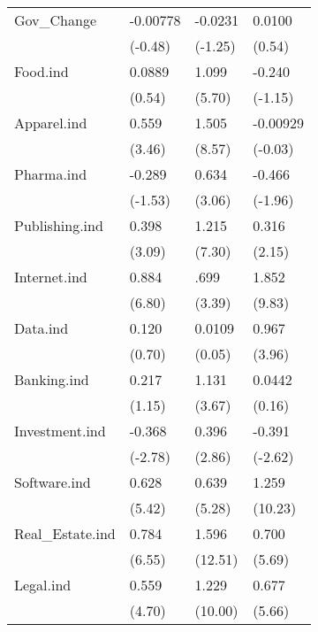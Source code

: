 \begin{longtable}{p{3 cm} p{2.25 cm} p{2.25 cm} p{2.25 cm}}
Gov\_Change  &    -0.00778         &     -0.0231         &      0.0100         \\
            &     (-0.48)         &     (-1.25)         &      (0.54)         \\
Food.ind &      0.0889         &       1.099\sym{***}&      -0.240         \\
            &      (0.54)         &      (5.70)         &     (-1.15)         \\
Apparel.ind &       0.559\sym{***}&       1.505\sym{***}&    -0.00929         \\
            &      (3.46)         &      (8.57)         &     (-0.03)         \\
Pharma.ind &      -0.289         &       0.634\sym{**} &      -0.466\sym{*}  \\
            &     (-1.53)         &      (3.06)         &     (-1.96)         \\
Publishing.ind &       0.398\sym{**} &       1.215\sym{***}&       0.316\sym{*}  \\
            &      (3.09)         &      (7.30)         &      (2.15)         \\
Internet.ind &       0.884\sym{***}&       .699\sym{***}&       1.852\sym{***}\\
            &      (6.80)         &      (3.39)         &      (9.83)         \\
Data.ind &       0.120         &   0.0109     &       0.967\sym{***}       \\
            &      (0.70)         &      (0.05)         &        (3.96)       \\
Banking.ind &       0.217         &       1.131\sym{***}&      0.0442         \\
            &      (1.15)         &      (3.67)         &      (0.16)         \\
Investment.ind &      -0.368\sym{**} &       0.396\sym{**} &      -0.391\sym{**} \\
            &     (-2.78)         &      (2.86)         &     (-2.62)         \\
Software.ind &       0.628\sym{***}&      0.639\sym{***} &       1.259\sym{***}\\
            &      (5.42)         &     (5.28)         &             (10.23)  \\
Real\_Estate.ind &       0.784\sym{***}&       1.596\sym{***}&       0.700\sym{***}\\
            &      (6.55)         &     (12.51)         &      (5.69)         \\
Legal.ind &       0.559\sym{***}&       1.229\sym{***}&       0.677\sym{***}\\
            &      (4.70)         &     (10.00)         &      (5.66)         \\


\end{longtable}
